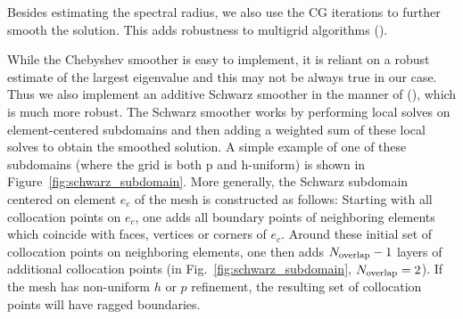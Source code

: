Besides estimating the spectral radius, we also use the CG iterations to further smooth the
solution. This adds robustness to multigrid algorithms (\cite{elman2001multigrid}).

While the Chebyshev smoother is easy to implement, it is reliant on a robust estimate of the largest eigenvalue and this may not be always true in our case. Thus we also implement an additive Schwarz smoother in the manner of (\cite{stiller2017robust}), which is much more robust. The Schwarz smoother works by performing local solves on element-centered subdomains and then adding a weighted sum of these local solves to obtain the smoothed solution. A simple example of one of these subdomains (where the grid is both p and h-uniform) is shown in Figure~\ref{fig:schwarz_subdomain}.
More generally, the Schwarz subdomain centered on element $e_c$
  of the mesh is constructed as follows: Starting with all collocation
  points on $e_c$, one adds all boundary points of neighboring elements
  which coincide with faces, vertices or corners of $e_c$.  Around these
  initial set of collocation points on neighboring elements, one then
  adds $N_{\rm overlap}-1$ layers of additional collocation points (in Fig.~\ref{fig:schwarz_subdomain}, $N_{\rm overlap}=2$).  If the mesh has non-uniform $h$ or $p$ refinement, the resulting set of collocation points will have ragged boundaries.

